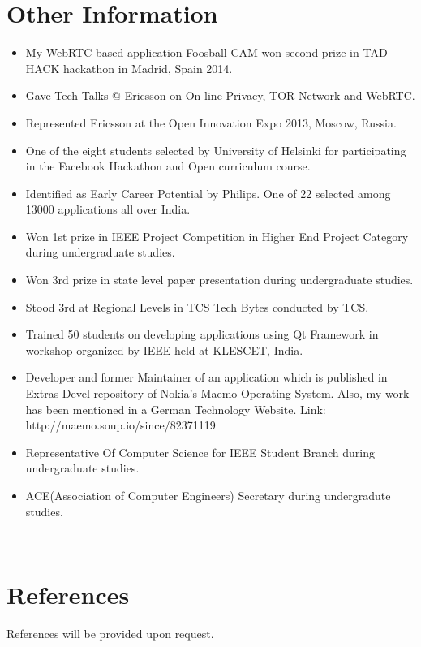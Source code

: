 \documentclass[]{friggeri-cv}
\begin{document}
\section{Other Information}
\begin{itemize}

\item My WebRTC based application \href{http://blog.tadhack.com/2014/06/09/tadhack-winners-madrid-remote3/}{Foosball-CAM} won second prize in TAD HACK hackathon in Madrid, Spain 2014.
\item Gave Tech Talks @ Ericsson on On-line Privacy, TOR Network and WebRTC.
\item Represented Ericsson at the Open Innovation Expo 2013, Moscow, Russia.
\item One of the eight students selected by University of Helsinki for participating in the Facebook Hackathon and Open curriculum course.
\item Identified as Early Career Potential by Philips. One of 22 selected among 13000 applications all over India.
\item Won 1st prize in IEEE Project Competition in Higher End Project Category during undergraduate studies.
\item Won 3rd prize in state level paper presentation during undergraduate studies.
\item Stood 3rd at Regional Levels in TCS Tech Bytes conducted by TCS.
\item Trained 50 students on developing applications using Qt Framework in workshop organized by IEEE held at KLESCET, India.
\item Developer and former Maintainer of an application which is published in Extras-Devel repository of Nokia’s Maemo Operating System. Also, my work has been mentioned in a German Technology Website. Link: http://maemo.soup.io/since/82371119
\item Representative Of Computer Science for IEEE Student Branch during undergraduate studies.
\item ACE(Association of Computer Engineers) Secretary during undergradute studies.
\end{itemize}
~
\section{References}
References will be provided upon request.
~
\end{document}
